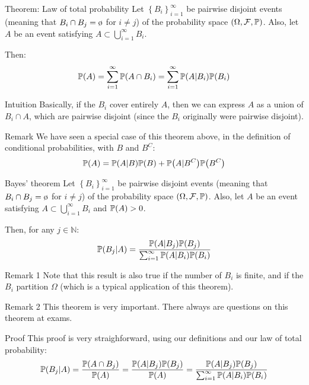 \documentclass[a4paper]{article}
\begin{document}
\begin{parag}{Theorem: Law of total probability}
    Let $\left\{B_i\right\}_{i=1}^{\infty}$ be pairwise disjoint events (meaning that $B_i \cap B_j = \o$ for $i \neq j$) of the probability space $\left(\Omega, \mathcal{F}, \prob\right)$. Also, let $A$ be an event satisfying $A \subset \bigcup_{i=1}^{\infty} B_i$. 

    Then: 
    \[\prob\left(A\right) = \sum_{i=1}^{\infty} \prob\left(A \cap B_i\right) = \sum_{i=1}^{\infty} \prob\left(A | B_i\right)\prob\left(B_i\right)\]

    \begin{subparag}{Intuition}
        Basically, if the $B_i$ cover entirely $A$, then we can express $A$ as a union of $B_i \cap A$, which are pairwise disjoint (since the $B_i$ originally were pairwise disjoint). 
    \end{subparag}

    \begin{subparag}{Remark}
        We have seen a special case of this theorem above, in the definition of conditional probabilities, with $B$ and $B^C$: 
        \[\prob\left(A\right) = \prob\left(A|B\right)\prob\left(B\right) + \prob\left(A|B^C\right)\prob\left(B^C\right)\]
    \end{subparag}
\end{parag}

\begin{parag}{Bayes' theorem}
    Let $\left\{B_i\right\}_{i=1}^{\infty}$ be pairwise disjoint events (meaning that $B_i \cap B_j = \o$ for $i \neq j$) of the probability space $\left(\Omega, \mathcal{F}, \prob\right)$. Also, let $A$ be an event satisfying $A \subset \bigcup_{i=1}^{\infty} B_i$ and $\prob\left(A\right) > 0$.

    Then, for any $j \in \mathbb{N}$:
    \[\prob\left(B_j | A\right) = \frac{\prob\left(A | B_j\right)\prob\left(B_j\right)}{\sum_{i=1}^{\infty} \prob\left(A | B_i\right)\prob\left(B_i\right)}\]

    \begin{subparag}{Remark 1}
        Note that this result is also true if the number of $B_i$ is finite, and if the $B_i$ partition $\Omega$ (which is a typical application of this theorem).
    \end{subparag}
    
    \begin{subparag}{Remark 2}
        This theorem is very important. There always are questions on this theorem at exams.
    \end{subparag}

    \begin{subparag}{Proof}
        This proof is very straighforward, using our definitions and our law of total probability: 
        \[\prob\left(B_j | A\right) = \frac{\prob\left(A \cap B_j\right)}{\prob\left(A\right)} = \frac{\prob\left(A | B_j\right)\prob\left(B_j\right)}{\prob\left(A\right)} = \frac{\prob\left(A | B_j\right)\prob\left(B_j\right)}{\sum_{i=1}^{\infty} \prob\left(A | B_i\right)\prob\left(B_i\right)}\]
    \end{subparag}
    
\end{parag}
\end{document}
